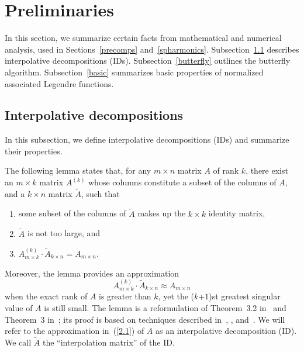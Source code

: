 \documentclass[final,3p,times]{elsarticle}
\begin{document}
\section{Preliminaries}
\label{prelims}


In this section, we summarize certain facts from mathematical
and numerical analysis, used in Sections~\ref{precomps} and~\ref{spharmonics}.
Subsection~\ref{ID_subsection} describes interpolative decompositions (IDs).
Subsection~\ref{butterfly} outlines the butterfly algorithm.
Subsection~\ref{basic} summarizes basic properties of normalized
associated Legendre functions.


\subsection{Interpolative decompositions}
\label{ID_subsection}

In this subsection, we define interpolative decompositions (IDs)
and summarize their properties.

The following lemma states that, for any $m \times n$ matrix $A$
of rank $k$, there exist an $m \times k$ matrix $A^{(k)}$
whose columns constitute a subset of the columns of $A$,
and a $k \times n$ matrix $\widetilde{A}$, such that
\begin{enumerate}
\item some subset of the columns of $\widetilde{A}$ makes up
the $k \times k$ identity matrix,
\item $\widetilde{A}$ is not too large, and
\item $A^{(k)}_{m \times k} \cdot \widetilde{A}_{k \times n} = A_{m \times n}$.
\end{enumerate}
Moreover, the lemma provides an approximation 
\begin{equation} \label{2.1}
A^{(k)}_{m \times k} \cdot \widetilde{A}_{k \times n} \approx A_{m \times n}
\end{equation}
when the exact rank of $A$ is greater than $k$,
yet the ($k$+$1$)st greatest singular value of $A$ is still small.
The lemma is a reformulation
of Theorem~3.2 in~\cite{martinsson-rokhlin-tygert1}
and Theorem~3 in~\cite{cheng-gimbutas-martinsson-rokhlin};
its proof is based on techniques described
in~\cite{goreinov-tyrtyshnikov}, \cite{gu-eisenstat96}, 
and~\cite{tyrtyshnikov}.
We will refer to the approximation in~(\ref{2.1}) of $A$
as an interpolative decomposition (ID).
We call $\widetilde{A}$ the ``interpolation matrix'' of the ID.
\end{document}
